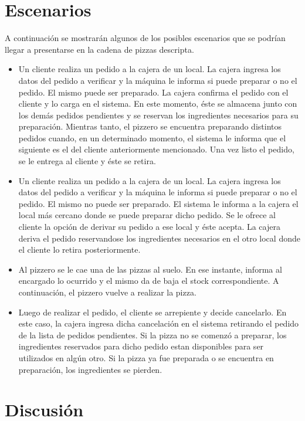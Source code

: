 \documentclass[a4paper,11pt] {article}
\begin{document}
\section*{Escenarios}
A continuaci\'on se mostrar\'an algunos de los posibles escenarios que se podr\'ian llegar a presentarse en la cadena de pizzas descripta. 
\begin{itemize}
	\item Un cliente realiza un pedido a la cajera de un local. La cajera ingresa los datos del pedido a verificar y la m\'aquina le informa si puede preparar o no el pedido. El mismo puede ser preparado. La cajera confirma el pedido con el cliente y lo carga en el sistema. En este momento, \'este se almacena junto con los dem\'as pedidos pendientes y se reservan los ingredientes necesarios para su preparaci\'on. Mientras tanto, el pizzero se encuentra preparando distintos pedidos cuando, en un determinado momento, el sistema le informa que el siguiente es el del cliente anteriormente mencionado. Una vez listo el pedido, se le entrega al cliente y \'este se retira.
	\item Un cliente realiza un pedido a la cajera de un local. La cajera ingresa los datos del pedido a verificar y la m\'aquina le informa si puede preparar o no el pedido. El mismo no puede ser preparado. El sistema le informa a la cajera el local m\'as cercano donde se puede preparar dicho pedido. Se le ofrece al cliente la opci\'on de derivar su pedido a ese local y \'este acepta. La cajera deriva el pedido reservandose los ingredientes necesarios en el otro local donde el cliente lo retira posteriormente.
	\item Al pizzero se le cae una de las pizzas al suelo. En ese instante, informa al encargado lo ocurrido y el mismo da de baja el stock correspondiente. A continuaci\'on, el pizzero vuelve a realizar la pizza.
    \item Luego de realizar el pedido, el cliente se arrepiente y decide cancelarlo. En este caso, la cajera ingresa dicha cancelaci\'on en el sistema retirando el pedido de la lista de pedidos pendientes. Si la pizza no se comenz\'o a preparar, los ingredientes reservados para dicho pedido estan disponibles para ser utilizados en alg\'un otro. Si la pizza ya fue preparada o se encuentra en preparaci\'on, los ingredientes se pierden.
\end{itemize}

\section*{Discusi\'on}
\end{document}
